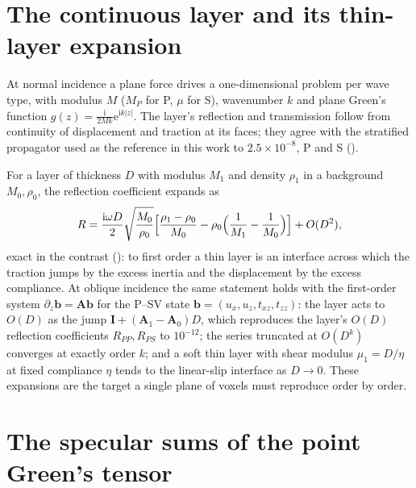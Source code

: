 \documentclass[extra,mreferee]{gji}
\newcommand{\bI}{\mathbf{I}}
\newcommand{\bA}{\mathbf{A}}
\begin{document}
\section{The continuous layer and its thin-layer expansion}\label{sec:continuum}

At normal incidence a plane force drives a one-dimensional problem per wave type, with modulus $M$
($M_P$ for P, $\mu$ for S), wavenumber $k$ and plane Green's function
$g(z)=\tfrac{\mathrm{i}}{2Mk}\mathrm{e}^{\mathrm{i}k|z|}$. The layer's reflection and transmission follow from continuity of
displacement and traction at its faces; they agree with the stratified propagator used as the
reference in this work to $2.5\times10^{-8}$, P and S ().

For a layer of thickness $D$ with modulus $M_1$ and density $\rho_1$ in a background $M_0,\rho_0$,
the reflection coefficient expands as
\begin{equation}\label{eq:thin}
  R=\frac{\mathrm{i}\omega D}{2}\sqrt{\frac{M_0}{\rho_0}}
  \Bigl[\frac{\rho_1-\rho_0}{M_0}-\rho_0\Bigl(\frac1{M_1}-\frac1{M_0}\Bigr)\Bigr]+O(D^2),
\end{equation}
exact in the contrast (): to first order a thin layer is an
interface across which the traction jumps by the excess inertia and the displacement by the excess
compliance. At oblique incidence the same statement holds with the first-order system
$\partial_z\mathbf b=\bA\mathbf b$ for the P--SV state $\mathbf b=(u_x,u_z,t_{xz},t_{zz})$: the layer
acts to $O(D)$ as the jump $\bI+(\bA_1-\bA_0)D$, which reproduces the layer's $O(D)$ reflection
coefficients $R_{PP},R_{PS}$ to $10^{-12}$; the series truncated at $O(D^k)$ converges at exactly
order $k$; and a soft thin layer with shear modulus $\mu_1=D/\eta$ at fixed compliance $\eta$ tends to
the linear-slip interface as $D\to0$. These expansions are the target a single plane of voxels must
reproduce order by order.

\section{The specular sums of the point Green's tensor}\label{sec:point}
\end{document}
